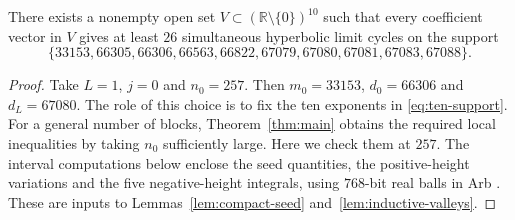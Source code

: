 \begin{corollary}\label{cor:ten-support}
There exists a nonempty open set $V\subset(\mathbb R\setminus\{0\})^{10}$
such that every coefficient vector in $V$ gives at least $26$ simultaneous
hyperbolic limit cycles on the support
\begin{equation}\label{eq:ten-support}
 \{33153,66305,66306,66563,66822,67079,67080,67081,67083,67088\}.
\end{equation}
\end{corollary}
\begin{proof}
Take $L=1$, $j=0$ and $n_0=257$. Then $m_0=33153$, $d_0=66306$
and $d_L=67080$. The role of this choice is to fix the ten exponents
in \eqref{eq:ten-support}. For a general number of blocks,
Theorem~\ref{thm:main} obtains the required local inequalities by taking
$n_0$ sufficiently large. Here we check them at $257$.
The interval computations below enclose the seed quantities, the
positive-height variations and the five negative-height integrals,
using $768$-bit real balls in Arb \cite{Johansson2017}.
These are inputs to Lemmas~\ref{lem:compact-seed}
and~\ref{lem:inductive-valleys}.


\end{proof}
